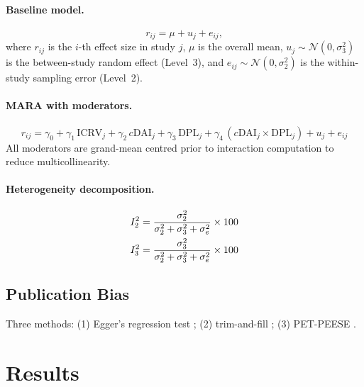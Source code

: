\documentclass[review,authoryear]{elsarticle}
\newcommand{\Isq}{I^{2}}                    %
\newcommand{\cDAI}{c\mathrm{DAI}}           %
\newcommand{\ICRV}{\mathrm{ICRV}}
\newcommand{\DPL}{\mathrm{DPL}}
\newcommand{\sigmasqtwo}{\sigma^{2}_{2}}     %
\newcommand{\sigmasqthree}{\sigma^{2}_{3}}   %
\begin{document}
\paragraph{Baseline model.}
\begin{equation}
  r_{ij} = \mu + u_{j} + e_{ij},
  \label{eq:baseline}
\end{equation}
where \(r_{ij}\) is the \(i\)-th effect size in study \(j\),
\(\mu\) is the overall mean,
\(u_{j} \sim \mathcal{N}(0, \sigmasqthree)\) is the between-study random
effect (Level~3), and \(e_{ij} \sim \mathcal{N}(0, \sigmasqtwo)\) is the
within-study sampling error (Level~2).

\paragraph{MARA with moderators.}
\begin{equation}
  r_{ij} = \gamma_{0} + \gamma_{1}\,\ICRV_{j}
    + \gamma_{2}\,\cDAI_{j} + \gamma_{3}\,\DPL_{j}
    + \gamma_{4}\,(\cDAI_{j} \times \DPL_{j})
    + u_{j} + e_{ij}
  \label{eq:mara}
\end{equation}
All moderators are grand-mean centred prior to interaction computation to
reduce multicollinearity.

\paragraph{Heterogeneity decomposition.}
\begin{align}
  \Isq_{2} &= \frac{\sigmasqtwo}{\sigmasqtwo + \sigmasqthree + \sigma^{2}_{e}}
    \times 100 \notag \\
  \Isq_{3} &= \frac{\sigmasqthree}{\sigmasqtwo + \sigmasqthree + \sigma^{2}_{e}}
    \times 100
  \label{eq:isq}
\end{align}

\subsection{Publication Bias}

Three methods: (1) Egger's regression test
\parencite{Egger1997,Sterne2011};
(2) trim-and-fill \parencite{DuvalTweedie2000};
(3) PET-PEESE \parencite{Stanley2014}.

\section{Results}
\label{sec:results}
\end{document}
